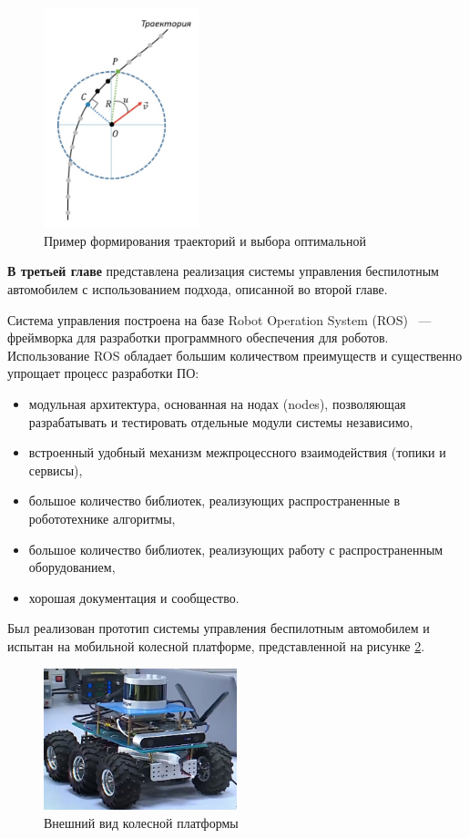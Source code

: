 \begin{figure}[h]
    \centering
    \includegraphics[width=0.4\textwidth]{images/path_moving}
    \caption{Пример формирования траекторий и выбора оптимальной}
    \label{img:path_moving}
\end{figure}


\textbf{В третьей главе} представлена реализация системы управления беспилотным автомобилем с
использованием подхода, описанной во второй главе.

Система управления построена на базе Robot Operation System (ROS) ~--- фреймворка для разработки
программного обеспечения для роботов. Использование ROS обладает большим количеством преимуществ
и существенно упрощает процесс разработки ПО:
\begin{itemize}
    \item модульная архитектура, основанная на нодах (nodes), позволяющая разрабатывать
          и тестировать отдельные модули системы независимо,
    \item встроенный удобный механизм межпроцессного взаимодействия (топики и сервисы),
    \item большое количество библиотек, реализующих распространенные в робототехнике алгоритмы,
    \item большое количество библиотек, реализующих работу с распространенным оборудованием,
    \item хорошая документация и сообщество.
\end{itemize}

Был реализован прототип системы управления беспилотным автомобилем и испытан на мобильной
колесной платформе, представленной на рисунке \ref{img:car}.

\begin{figure}[h]
    \centering
    \includegraphics[width=0.5\textwidth]{images/car}
    \caption{Внешний вид колесной платформы}
    \label{img:car}
\end{figure}

